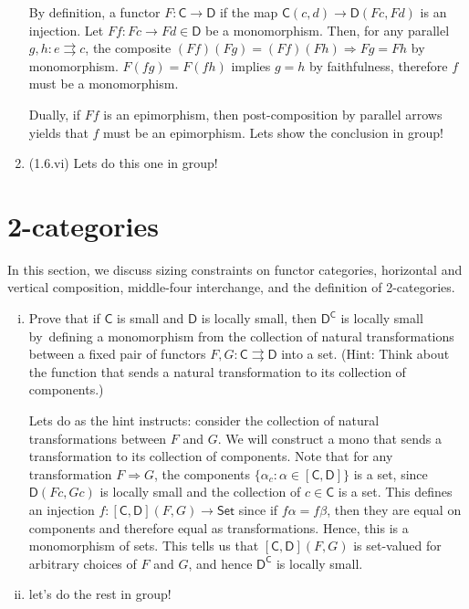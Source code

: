 \documentclass[10pt, oneside]{article}   	%
\newcommand{\cat}[1]{\bm{ \mathsf{#1} }}
\newcommand{\cc}{\cat{C}}
\newcommand{\dd}{\cat{D}}
\begin{document}
\begin{enumerate}[i]
	By definition, a functor $F: \cc \to \dd$ if the map $\cc(c, d) \to \dd(Fc, Fd)$ is an injection. Let $Ff :  Fc \to Fd \in \dd$ be a monomorphism. Then, for any parallel $g, h : e \rightrightarrows c $,  the composite $(Ff)(Fg) = (Ff)(Fh) \Rightarrow Fg = Fh$ by monomorphism. $F(fg) = F(fh)$ implies $g = h$ by faithfulness, therefore $f$ must be a monomorphism.
	
	Dually, if $Ff$ is an epimorphism, then post-composition by parallel arrows yields that $f$ must be an epimorphism. Lets show the conclusion in group!
	
	\item (1.6.vi) Lets do this one in group!
	
\end{enumerate} 

\section{2-categories}

In this section, we discuss sizing constraints on functor categories, horizontal and vertical composition, middle-four interchange, and the definition of 2-categories. 

\begin{enumerate}[(i)]

\item Prove that if $\cc$ is small and $\dd$ is locally small, then $\dd^{\cc}$ is locally small by defining a monomorphism from the collection of natural transformations between a fixed pair of functors $F,G: \cc \rightrightarrows \dd$ into a set. (Hint: Think about the function that sends a natural transformation to its collection of components.)

Lets do as the hint instructs: consider the collection of natural transformations between $F$ and $G$. We will construct a mono that sends a transformation to its collection of components. Note that for any transformation $F \Rightarrow G$, the components $\{ \alpha_c : \alpha \in [\cc, \dd]\}$ is a set, since $\dd(Fc, Gc)$ is locally small and the collection of $c \in \cc$ is a set. This defines an injection $f : [\cc, \dd](F, G) \to \cat{Set}$ since if $f\alpha = f\beta$, then they are equal on components and therefore equal as transformations. Hence, this is a monomorphism of sets. This tells us that $[\cc, \dd](F, G)$ is set-valued for arbitrary choices of $F$ and $G$, and hence $\dd^{\cc}$ is locally small. 

\item let's do the rest in group!
\end{enumerate}
\end{document}
